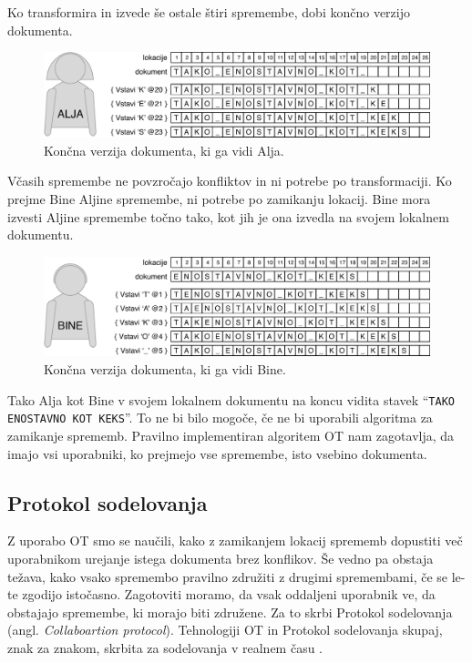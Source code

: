 \documentclass[a4paper, 12pt, twoside]{book}
\begin{document}
Ko transformira in izvede še ostale štiri spremembe, dobi končno verzijo dokumenta.

\begin{figure}[placement h]
\begin{center}
\includegraphics[width=12cm]{img/ot5.pdf}
\end{center}
\caption{Končna verzija dokumenta, ki ga vidi Alja.}
\label{ot5}
\end{figure}

Včasih spremembe ne povzročajo konfliktov in ni potrebe po transformaciji. Ko prejme Bine Aljine spremembe, ni potrebe po zamikanju lokacij. Bine mora izvesti Aljine spremembe točno tako, kot jih je ona izvedla na svojem lokalnem dokumentu.

\begin{figure}[placement h]
\begin{center}
\includegraphics[width=12cm]{img/ot6.pdf}
\end{center}
\caption{Končna verzija dokumenta, ki ga vidi Bine.}
\label{ot6}
\end{figure}

Tako Alja kot Bine v svojem lokalnem dokumentu na koncu vidita stavek “{\tt TAKO ENOSTAVNO KOT KEKS}”. To ne bi bilo mogoče, če ne bi uporabili algoritma za zamikanje sprememb. Pravilno implementiran algoritem OT nam zagotavlja, da imajo vsi uporabniki, ko prejmejo vse spremembe, isto vsebino dokumenta.

\subsection{Protokol sodelovanja}
\label{subsec:ps}

Z uporabo OT smo se naučili, kako z zamikanjem lokacij sprememb dopustiti več uporabnikom urejanje istega dokumenta brez konflikov. Še vedno pa obstaja težava, kako vsako spremembo pravilno združiti z drugimi spremembami, če se le-te zgodijo istočasno. Zagotoviti moramo, da vsak oddaljeni uporabnik ve, da obstajajo spremembe, ki morajo biti združene. Za to skrbi Protokol sodelovanja (angl. \textit{Collaboartion protocol}). Tehnologiji OT in Protokol sodelovanja skupaj, znak za znakom, skrbita za sodelovanja v realnem času \cite{gdocs23}.
\end{document}
